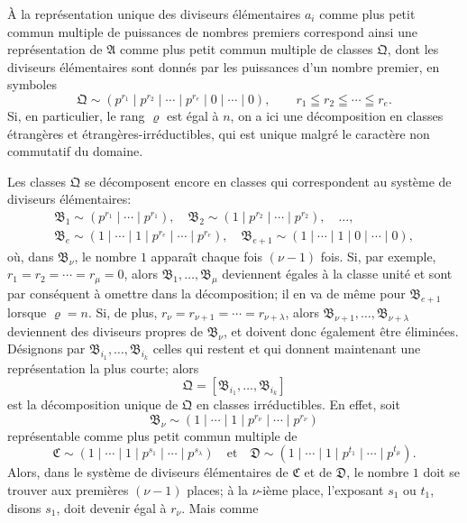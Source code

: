 À la représentation unique des diviseurs élémentaires $a_i$ comme plus petit commun multiple de puissances de nombres premiers correspond ainsi une représentation de $\mathfrak A$ comme plus petit commun multiple de classes $\mathfrak Q$, dont les diviseurs élémentaires sont donnés par les puissances d'un nombre premier, en symboles
\[
 \mathfrak Q\sim(p^{r_1}\mid p^{r_2}\mid\cdots\mid p^{r_e}\mid0\mid\cdots\mid0),
 \qquad r_1\leqq r_2\leqq\cdots\leqq r_e.
\]
Si, en particulier, le rang $\varrho$ est égal à $n$, on a ici une décomposition en classes étrangères et étrangères-irréductibles, qui est unique malgré le caractère non commutatif du domaine.

Les classes $\mathfrak Q$ se décomposent encore en classes qui correspondent au système de diviseurs élémentaires:
\[
\begin{gathered}
 \mathfrak B_1\sim(p^{r_1}\mid\cdots\mid p^{r_1}),\quad
 \mathfrak B_2\sim(1\mid p^{r_2}\mid\cdots\mid p^{r_2}),\quad \ldots,\\
 \mathfrak B_e\sim(1\mid\cdots\mid1\mid p^{r_e}\mid\cdots\mid p^{r_e}),\quad
 \mathfrak B_{e+1}\sim(1\mid\cdots\mid1\mid0\mid\cdots\mid0),
\end{gathered}
\]
où, dans $\mathfrak B_\nu$, le nombre $1$ apparaît chaque fois $(\nu-1)$ fois. Si, par exemple, $r_1=r_2=\cdots=r_\mu=0$, alors $\mathfrak B_1,
\ldots,\mathfrak B_\mu$ deviennent égales à la classe unité et sont par conséquent à omettre dans la décomposition; il en va de même pour $\mathfrak B_{e+1}$ lorsque $\varrho=n$. Si, de plus, $r_\nu=r_{\nu+1}=\cdots=r_{\nu+\lambda}$, alors $\mathfrak B_{\nu+1},
\ldots,\mathfrak B_{\nu+\lambda}$ deviennent des diviseurs propres de $\mathfrak B_\nu$, et doivent donc également être éliminées. Désignons par $\mathfrak B_{i_1},
\ldots,\mathfrak B_{i_k}$ celles qui restent et qui donnent maintenant une représentation la plus courte; alors
\[
 \mathfrak Q=[\mathfrak B_{i_1},
\ldots,\mathfrak B_{i_k}]
\]
est la décomposition unique de $\mathfrak Q$ en classes irréductibles. En effet, soit
\[
 \mathfrak B_\nu\sim(1\mid\cdots\mid1\mid p^{r_\nu}\mid\cdots\mid p^{r_\nu})
\]
représentable comme plus petit commun multiple de
\[
 \mathfrak C\sim(1\mid\cdots\mid1\mid p^{s_1}\mid\cdots\mid p^{s_\lambda})
 \quad\text{et}\quad
 \mathfrak D\sim(1\mid\cdots\mid1\mid p^{t_1}\mid\cdots\mid p^{t_\mu}).
\]
Alors, dans le système de diviseurs élémentaires de $\mathfrak C$ et de $\mathfrak D$, le nombre $1$ doit se trouver aux premières $(\nu-1)$ places; à la $\nu$-ième place, l'exposant $s_1$ ou $t_1$, disons $s_1$, doit devenir égal à $r_\nu$. Mais comme
